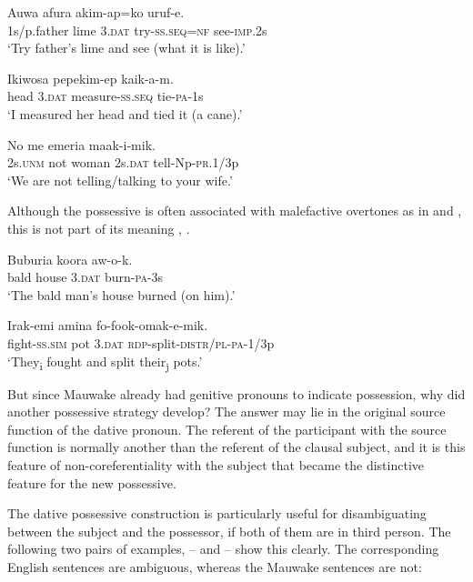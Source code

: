 \ea%
\label{ex:3:x1791}
\gll Auwa afura  akim-ap=ko uruf-e. \\
1s/p.father lime 3.\textsc{dat} try-\textsc{ss}.\textsc{seq}=\textsc{nf} see-\textsc{imp}.2s\\
\glt`Try father's lime and see (what it is like).'
\z

\ea%
\label{ex:3:x1790}
\gll Ikiwosa  pepekim-ep kaik-a-m. \\
head 3.\textsc{dat} measure-\textsc{ss}.\textsc{seq} tie-\textsc{pa}-1s\\
\glt`I measured her head and tied it (a cane).'
\z

\ea%
\label{ex:3:x1795}
\gll No me emeria  maak-i-mik. \\
2s.\textsc{unm} not woman 2s.\textsc{dat} tell-Np-\textsc{pr}.1/3p\\
\glt`We are not telling/talking to your wife.'
\z

Although the possessive is often associated with malefactive overtones as in  and , this is not part of its meaning , . 

\ea%
\label{ex:3:x1787}
\gll Buburia koora  aw-o-k. \\
bald house 3.\textsc{dat} burn-\textsc{pa}-3s \\
\glt`The bald man's house burned (on him).'
\z

\ea%
\label{ex:3:x1792}
\gll Irak-emi amina  fo-fook-omak-e-mik. \\
fight-\textsc{ss}.\textsc{sim} pot 3.\textsc{dat} \textsc{rdp}-split-\textsc{distr}/\textsc{pl}-\textsc{pa}-1/3p\\
\glt`They\textsubscript{i} fought and split their\textsubscript{j} pots.'
\z

But since Mauwake already had genitive pronouns to indicate possession, why did another possessive strategy develop? The answer may lie in the original source function of the dative pronoun. The referent of the participant with the source function is normally another than the referent of the clausal subject, and it is this feature of non-coreferentiality with the subject that became the distinctive feature for the new possessive. 

The dative possessive construction is particularly useful for disambiguating between the subject and the possessor, if both of them are in third person. The following two pairs of examples, -- and -- show this clearly. The corresponding English sentences are ambiguous, whereas the Mauwake sentences are not: 

